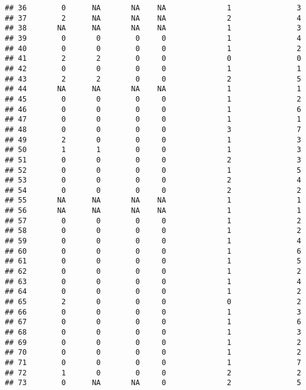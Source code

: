 \documentclass[
]{article}
\begin{document}
\begin{verbatim}
## 36        0      NA       NA    NA              1               3
## 37        2      NA       NA    NA              2               4
## 38       NA      NA       NA    NA              1               3
## 39        0       0        0     0              1               4
## 40        0       0        0     0              1               2
## 41        2       2        0     0              0               0
## 42        0       0        0     0              1               1
## 43        2       2        0     0              2               5
## 44       NA      NA       NA    NA              1               1
## 45        0       0        0     0              1               2
## 46        0       0        0     0              1               6
## 47        0       0        0     0              1               1
## 48        0       0        0     0              3               7
## 49        2       0        0     0              1               3
## 50        1       1        0     0              1               3
## 51        0       0        0     0              2               3
## 52        0       0        0     0              1               5
## 53        0       0        0     0              2               4
## 54        0       0        0     0              2               2
## 55       NA      NA       NA    NA              1               1
## 56       NA      NA       NA    NA              1               1
## 57        0       0        0     0              1               2
## 58        0       0        0     0              1               2
## 59        0       0        0     0              1               4
## 60        0       0        0     0              1               6
## 61        0       0        0     0              1               5
## 62        0       0        0     0              1               2
## 63        0       0        0     0              1               4
## 64        0       0        0     0              1               2
## 65        2       0        0     0              0               2
## 66        0       0        0     0              1               3
## 67        0       0        0     0              1               6
## 68        0       0        0     0              1               3
## 69        0       0        0     0              1               2
## 70        0       0        0     0              1               2
## 71        0       0        0     0              1               7
## 72        1       0        0     0              2               2
## 73        0      NA       NA     0              2               5

\end{verbatim}
\end{document}
